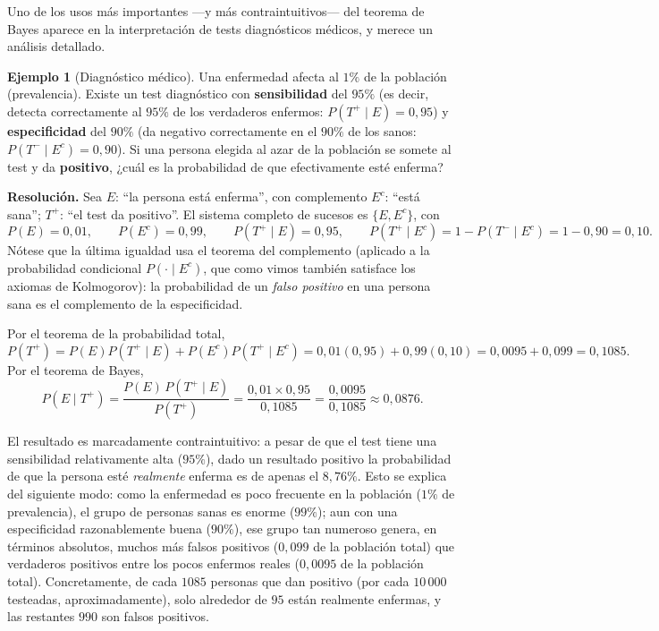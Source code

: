 \documentclass[11pt,a4paper]{article}
\theoremstyle{plain}
\theoremstyle{definition}
\newtheorem{ejemplo}[teorema]{Ejemplo}
\theoremstyle{remark}
\begin{document}
Uno de los usos más importantes —y más contraintuitivos— del teorema de Bayes aparece en la interpretación de tests diagnósticos médicos, y merece un análisis detallado.

\begin{ejemplo}[Diagnóstico médico]
Una enfermedad afecta al $1\%$ de la población (prevalencia). Existe un test diagnóstico con \textbf{sensibilidad} del $95\%$ (es decir, detecta correctamente al $95\%$ de los verdaderos enfermos: $P(T^+\mid E)=0{,}95$) y \textbf{especificidad} del $90\%$ (da negativo correctamente en el $90\%$ de los sanos: $P(T^-\mid E^c)=0{,}90$). Si una persona elegida al azar de la población se somete al test y da \textbf{positivo}, ¿cuál es la probabilidad de que efectivamente esté enferma?
\end{ejemplo}

\textbf{Resolución.} Sea $E$: ``la persona está enferma'', con complemento $E^c$: ``está sana''; $T^+$: ``el test da positivo''. El sistema completo de sucesos es $\{E,E^c\}$, con
\[
P(E)=0{,}01, \qquad P(E^c)=0{,}99, \qquad P(T^+\mid E) = 0{,}95, \qquad P(T^+\mid E^c) = 1-P(T^-\mid E^c) = 1-0{,}90 = 0{,}10.
\]
Nótese que la última igualdad usa el teorema del complemento (aplicado a la probabilidad condicional $P(\cdot\mid E^c)$, que como vimos también satisface los axiomas de Kolmogorov): la probabilidad de un \emph{falso positivo} en una persona sana es el complemento de la especificidad.

Por el teorema de la probabilidad total,
\[
P(T^+) = P(E)P(T^+\mid E) + P(E^c)P(T^+\mid E^c) = 0{,}01(0{,}95) + 0{,}99(0{,}10) = 0{,}0095+0{,}099 = 0{,}1085.
\]
Por el teorema de Bayes,
\[
P(E\mid T^+) = \frac{P(E)\,P(T^+\mid E)}{P(T^+)} = \frac{0{,}01 \times 0{,}95}{0{,}1085} = \frac{0{,}0095}{0{,}1085} \approx 0{,}0876.
\]

El resultado es marcadamente contraintuitivo: a pesar de que el test tiene una sensibilidad relativamente alta ($95\%$), dado un resultado positivo la probabilidad de que la persona esté \emph{realmente} enferma es de apenas el $8{,}76\%$. Esto se explica del siguiente modo: como la enfermedad es poco frecuente en la población ($1\%$ de prevalencia), el grupo de personas sanas es enorme ($99\%$); aun con una especificidad razonablemente buena ($90\%$), ese grupo tan numeroso genera, en términos absolutos, muchos más falsos positivos ($0{,}099$ de la población total) que verdaderos positivos entre los pocos enfermos reales ($0{,}0095$ de la población total). Concretamente, de cada $1085$ personas que dan positivo (por cada $10\,000$ testeadas, aproximadamente), solo alrededor de $95$ están realmente enfermas, y las restantes $990$ son falsos positivos.
\end{document}
